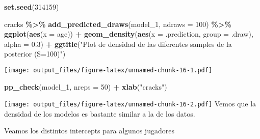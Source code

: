 \documentclass[
]{article}
\newenvironment{Shaded}{\begin{snugshade}}{\end{snugshade}}
\newcommand{\AttributeTok}[1]{\textcolor[rgb]{0.13,0.29,0.53}{#1}}
\newcommand{\DecValTok}[1]{\textcolor[rgb]{0.00,0.00,0.81}{#1}}
\newcommand{\FloatTok}[1]{\textcolor[rgb]{0.00,0.00,0.81}{#1}}
\newcommand{\FunctionTok}[1]{\textcolor[rgb]{0.13,0.29,0.53}{\textbf{#1}}}
\newcommand{\NormalTok}[1]{#1}
\newcommand{\SpecialCharTok}[1]{\textcolor[rgb]{0.81,0.36,0.00}{\textbf{#1}}}
\newcommand{\StringTok}[1]{\textcolor[rgb]{0.31,0.60,0.02}{#1}}
\begin{document}
\begin{Shaded}
\begin{Highlighting}[]
\FunctionTok{set.seed}\NormalTok{(}\DecValTok{314159}\NormalTok{)}

\NormalTok{cracks }\SpecialCharTok{\%\textgreater{}\%}
    \FunctionTok{add\_predicted\_draws}\NormalTok{(model\_1, }\AttributeTok{ndraws =} \DecValTok{100}\NormalTok{) }\SpecialCharTok{\%\textgreater{}\%}
    \FunctionTok{ggplot}\NormalTok{(}\FunctionTok{aes}\NormalTok{(}\AttributeTok{x =}\NormalTok{ age)) }\SpecialCharTok{+}
      \FunctionTok{geom\_density}\NormalTok{(}\FunctionTok{aes}\NormalTok{(}\AttributeTok{x =}\NormalTok{ .prediction, }\AttributeTok{group =}\NormalTok{ .draw), }\AttributeTok{alpha =} \FloatTok{0.3}\NormalTok{) }\SpecialCharTok{+}
      \FunctionTok{ggtitle}\NormalTok{(}\StringTok{"Plot de densidad de las diferentes samples de la posterior (S=100)"}\NormalTok{)}
\end{Highlighting}
\end{Shaded}

\texttt{[image: output\_files/figure-latex/unnamed-chunk-16-1.pdf]}

\begin{Shaded}
\begin{Highlighting}[]
\FunctionTok{pp\_check}\NormalTok{(model\_1, }\AttributeTok{nreps =} \DecValTok{50}\NormalTok{) }\SpecialCharTok{+}
     \FunctionTok{xlab}\NormalTok{(}\StringTok{"cracks"}\NormalTok{)}
\end{Highlighting}
\end{Shaded}

\texttt{[image: output\_files/figure-latex/unnamed-chunk-16-2.pdf]} Vemos
que la densidad de los modelos es bastante similar a la de los datos.

Veamos los distintos intercepts para algunos jugadores
\end{document}
